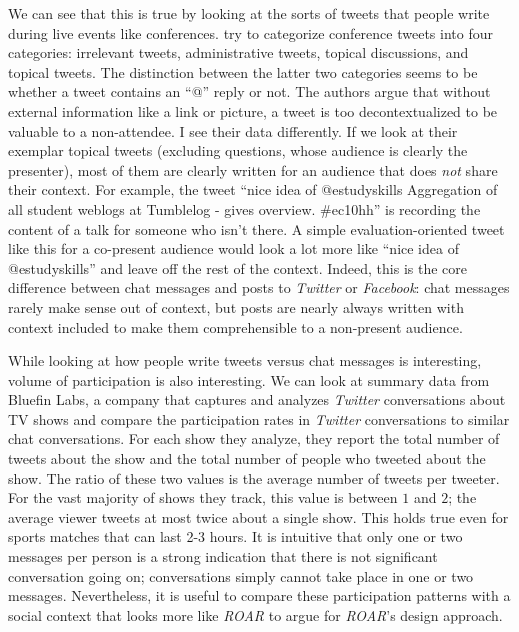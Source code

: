 We can see that this is true by looking at the sorts of tweets that people write during live events like conferences. \citet{Ebner:2010tx} try to categorize conference tweets into four categories: irrelevant tweets, administrative tweets, topical discussions, and topical tweets. The distinction between the latter two categories seems to be whether a tweet contains an ``@'' reply or not. The authors argue that without external information like a link or picture, a tweet is too decontextualized to be valuable to a non-attendee. I see their data differently. If we look at their exemplar topical tweets (excluding questions, whose audience is clearly the presenter), most of them are clearly written for an audience that does \emph{not} share their context.  For example, the tweet ``nice idea of @estudyskills Aggregation of all student weblogs at Tumblelog - gives overview. \#ec10hh'' is recording the content of a talk for someone who isn't there. A simple evaluation-oriented tweet like this for a co-present audience would look a lot more like ``nice idea of @estudyskills'' and leave off the rest of the context. Indeed, this is the core difference between chat messages and posts to \emph{Twitter} or \emph{Facebook}: chat messages rarely make sense out of context, but posts are nearly always written with context included to make them comprehensible to a non-present audience. 


While looking at how people write tweets versus chat messages is interesting, volume of participation is also interesting. We can look at summary data from Bluefin Labs, a company that captures and analyzes \emph{Twitter} conversations about TV shows and compare the participation rates in \emph{Twitter} conversations to similar chat conversations. For each show they analyze, they report the total number of tweets about the show and the total number of people who tweeted about the show. The ratio of these two values is the average number of tweets per tweeter. For the vast majority of shows they track, this value is between $1$ and $2$; the average viewer tweets at most twice about a single show. This holds true even for sports matches that can last 2-3 hours. It is intuitive that only one or two messages per person is a strong indication that there is not significant conversation going on; conversations simply cannot take place in one or two messages. Nevertheless, it is useful to compare these participation patterns with a social context that looks more like \emph{ROAR} to argue for \emph{ROAR}'s design approach.

